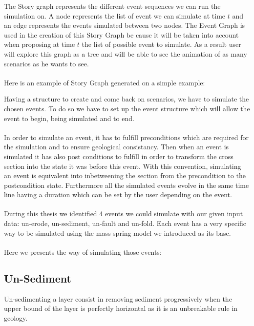 \documentclass[12pt, a4paper]{memoir} %
\begin{document}
The Story graph represents the different event sequences we can run the simulation on. A node represents the list of event we can simulate at time $t$ and an edge represents the events simulated between two nodes. The Event Graph is used in the creation of this Story Graph be cause it will be taken into account when proposing at time $t$ the list of possible event to simulate. As a result user will explore this graph as a tree and will be able to see the animation of as many scenarios as he wants to see.\\\\

Here is an example of Story Graph generated on a simple example:


Having a structure to create and come back on scenarios, we have to simulate the chosen events. To do so we have to set up the event structure which will allow the event to begin, being simulated and to end.\\\\

In order to simulate an event, it has to fulfill preconditions which are required for the simulation and to ensure geological consistancy. Then when an event is simulated it has also post conditions to fulfill in order to transform the cross section into the state it was before this event. With this convention, simulating an event is equivalent into inbetweening the section from the precondition to the postcondition state. Furthermore all the simulated events evolve in the same time line having a duration which can be set by the user depending on the event.\\\\

During this thesis we identified 4 events we could simulate with our given input data: un-erode, un-sediment, un-fault and un-fold. Each event has a very specific way to be simulated using the mass-spring model we introduced as its base.\\\\

Here we presents the way of simulating those events:

\subsection{Un-Sediment}

Un-sedimenting a layer consist in removing sediment progressively when the upper bound of the layer is perfectly horizontal as it is an unbreakable rule in geology.\\\\
\end{document}
